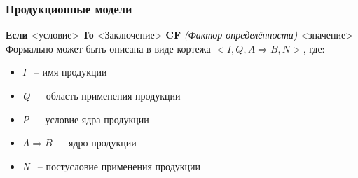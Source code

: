 \documentclass{article}
\begin{document}
\subsubsection{Продукционные модели}
\textbf{Если} \color{blue}<условие>\color{black} \textbf{То} \color{blue}<Заключение>\color{black} \textbf{CF} \textit{(Фактор определённости)} \color{blue}<значение>\color{black}
\newline
Формально может быть описана в виде кортежа \textit{$<I, Q, A\Rightarrow B, N>$}, где:
\begin{itemize}
    \item \textit{I} ~-- имя продукции
    \item \textit{Q} ~-- область применения продукции
    \item \textit{P} ~-- условие ядра продукции
    \item \textit{$A\Rightarrow B$} ~-- ядро продукции
    \item \textit{N} ~-- постусловие применения продукции
\end{itemize}
\end{document}
